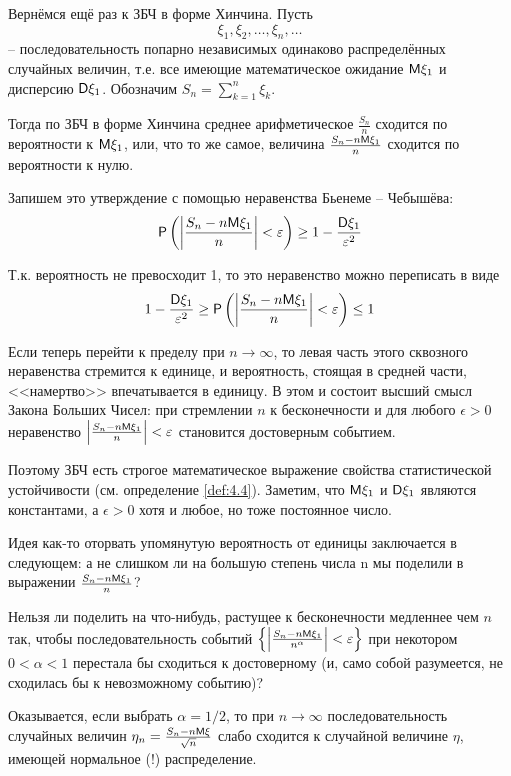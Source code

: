 \begin{zam}
\label{zam:26.2}
Вернёмся ещё раз к ЗБЧ в форме Хинчина. Пусть $$\xi_1 , \xi_2 , \ldots , \xi_n , \ldots$$ -- последовательность попарно независимых одинаково распределённых случайных величин, т.е. все имеющие математическое ожидание $\mathsf{M}\xi_1$ и дисперсию $\mathsf{D}\xi_1$. Обозначим $S_n=\sum\limits_{k=1}^n\xi_k$. 

Тогда по ЗБЧ в форме Хинчина среднее арифметическое $\frac{S_n}{n}$ сходится по вероятности к $\mathsf{M}\xi_1$, или, что то же самое, величина $\frac{S_n-n\mathsf{M}\xi_1}{n}$ сходится по вероятности к нулю. 

Запишем это утверждение с помощью неравенства Бьенеме – Чебышёва:
$$
\mathsf{P}\left( \left|\frac{S_n-n\mathsf{M}\xi_1}{n}\right| < \varepsilon \right) \geq 1-\frac{\mathsf{D}\xi_1}{\varepsilon^2}
$$

Т.к. вероятность не превосходит 1, то это неравенство можно переписать в виде
$$
1-\frac{\mathsf{D}\xi_1}{\varepsilon^2} \geq \mathsf{P}\left( \left|\frac{S_n-n\mathsf{M}\xi_1}{n}\right| < \varepsilon \right) \leq 1 
$$

Если теперь перейти к пределу при $n \to \infty$, то левая часть этого сквозного неравенства стремится к единице, и вероятность, стоящая в средней части, <<намертво>> впечатывается в единицу. В этом и состоит высший
смысл Закона Больших Чисел: при стремлении $n$ к бесконечности и для любого $\epsilon > 0$ неравенство  $\left|\frac{S_n-n\mathsf{M}\xi_1}{n}\right|  < \varepsilon$ становится достоверным событием. 

Поэтому ЗБЧ есть строгое математическое выражение свойства
статистической устойчивости (см. определение \ref{def:4.4}). Заметим, что $\mathsf{M}\xi_1$ и $\mathsf{D}\xi_1$ являются константами, а $\epsilon > 0$ хотя и любое, но тоже постоянное число.

Идея как-то оторвать упомянутую вероятность от единицы заключается в следующем: а не слишком ли на большую степень числа n мы поделили в выражении $\frac{S_n-n\mathsf{M}\xi_1}{n}$?

Нельзя ли поделить на что-нибудь, растущее к бесконечности
медленнее чем $n$ так, чтобы последовательность событий
$\left\{\left|\frac{S_n-n\mathsf{M}\xi_1}{n^\alpha}\right|  < \varepsilon\right\}$
при некотором $0 < \alpha < 1$ перестала бы сходиться к достоверному (и, само собой разумеется, не сходилась бы к невозможному событию)? 

Оказывается, если выбрать $\alpha = 1/2$, то при $n \to \infty$ последовательность случайных величин $\eta_n = \frac{S_n -n\mathsf{M}\xi}{\sqrt{n}}$ слабо сходится к случайной величине $\eta$, имеющей нормальное (!) распределение.
\end{zam}

